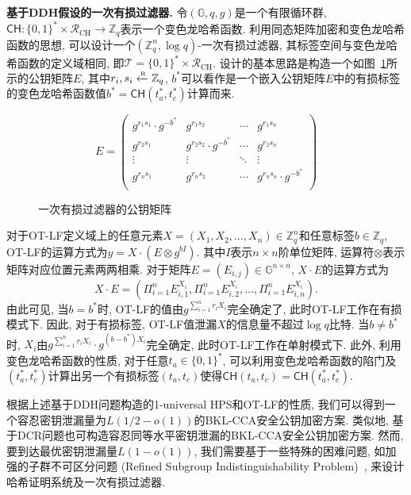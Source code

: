 \medskip\noindent\textbf{基于DDH假设的一次有损过滤器.} 令$(\mathbb{G}, q, g)$是一个有限循环群, $\mathsf{CH}: \{0, 1\}^* \times \mathcal{R}_{\text{CH}} \rightarrow \mathbb{Z}_q$表示一个变色龙哈希函数. 利用同态矩阵加密和变色龙哈希函数的思想, 可以设计一个$(\mathbb{Z}_q^n, \log q)$-一次有损过滤器, 其标签空间与变色龙哈希函数的定义域相同, 即$\mathcal{T} =  \{0, 1\}^* \times \mathcal{R}_{\text{CH}}$.  设计的基本思路是构造一个如图~\ref{figure:DDH-LF}所示的公钥矩阵$E$, 其中$r_i, s_i\xleftarrow{\textup{\tiny R}} \mathbb{Z}_q$, $b^*$可以看作是一个嵌入公钥矩阵$E$中的有损标签的变色龙哈希函数值$b^* = \mathsf{CH}(t_a^*, t_c^*)$计算而来. 
\begin{figure}[!hbtp]
\begin{center}
\[
E = \left(
\begin{array}{llll}
g^{r_1s_1}\cdot g^{-b^*} & g^{r_1s_2}               & \cdots & g^{r_1s_n}\\
g^{r_2s_1}               & g^{r_2s_2}\cdot g^{-b^*} & \cdots & g^{r_2s_n}\\
\vdots                   & \vdots                   & \ddots & \vdots    \\
g^{r_ns_1}               & g^{r_ns_2}               & \cdots & g^{r_ns_n}\cdot g^{-b^*}\\
\end{array}
\right)
\]
\end{center}
\caption{一次有损过滤器的公钥矩阵}\label{figure:DDH-LF}
\end{figure}

对于OT-LF定义域上的任意元素$X = (X_1, X_2, \ldots, X_n) \in \mathbb{Z}_q^n$和任意标签$b \in \mathbb{Z}_q$, OT-LF的运算方式为$y = X\cdot (E \otimes g^{bI})$. 其中$I$表示$n \times n$阶单位矩阵, 运算符$\otimes$表示矩阵对应位置元素两两相乘. 对于矩阵$E = (E_{i,j}) \in \mathbb{G}^{n \times n}$, $X\cdot E$的运算方式为
\[
X \cdot E = \left(\Pi_{i=1}^n E_{i, 1}^{X_i}, \Pi_{i=1}^n E_{i, 2}^{X_i},\ldots, \Pi_{i=1}^n E_{i, n}^{X_i}\right).
\]
由此可见, 当$b = b^*$时, OT-LF的值由$g^{\sum_{i=1}^n r_iX_i}$完全确定了, 此时OT-LF工作在有损模式下. 因此, 对于有损标签, OT-LF值泄漏$X$的信息量不超过$\log q$比特. 当$b \neq b^*$时, $X_i$由$g^{\sum_{i=1}^n r_iX_i}\cdot g^{(b - b^*)X_i}$完全确定, 此时OT-LF工作在单射模式下. 此外, 利用变色龙哈希函数的性质, 对于任意$t_a \in \{0, 1\}^*$, 可以利用变色龙哈希函数的陷门及$(t_a^*, t_c^*)$计算出另一个有损标签$(t_a, t_c)$使得$\mathsf{CH}(t_a, t_c) = \mathsf{CH}(t_a^*, t_c^*)$.

\begin{note}
根据上述基于DDH问题构造的1-universal HPS和OT-LF的性质, 我们可以得到一个容忍密钥泄漏量为$L(1/2 - o(1))$的BKL-CCA安全公钥加密方案. 类似地, 基于DCR问题也可构造容忍同等水平密钥泄漏的BKL-CCA安全公钥加密方案. 然而, 要到达最优密钥泄漏量$L(1 - o(1))$, 我们需要基于一些特殊的困难问题, 如加强的子群不可区分问题 (Refined Subgroup Indistinguishability Problem)~\cite{Qin-PKC-2014}, 来设计哈希证明系统及一次有损过滤器.
\end{note}


